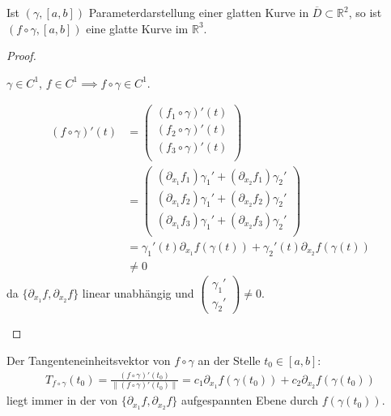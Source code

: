 \begin{theorem}[Satz]
  Ist $(\gamma,[a,b])$ Parameterdarstellung einer glatten Kurve in $\overline{D} \subset \mathbb{R}^2$, so ist $(f \circ \gamma,[a,b])$ eine glatte Kurve im $\mathbb{R}^3$.
  
  \begin{proof}
    \begin{enum-arab}
      \item $\gamma \in C^1$, $f \in C^1 \implies f \circ \gamma \in C^1$.
      
      \item 
      \begin{align*}
        (f \circ \gamma)'(t) &=
        \begin{pmatrix}
          (f_1 \circ \gamma)'(t) \\
          (f_2 \circ \gamma)'(t) \\
          (f_3 \circ \gamma)'(t) \\
        \end{pmatrix} \\
        &=
        \begin{pmatrix}
          (\partial_{x_1} f_1) \gamma_1' + (\partial_{x_2} f_1) \gamma_2' \\
          (\partial_{x_1} f_2) \gamma_1' + (\partial_{x_2} f_2) \gamma_2' \\
          (\partial_{x_1} f_3) \gamma_1' + (\partial_{x_2} f_3) \gamma_2' \\
        \end{pmatrix} \\
        &= \gamma_1'(t) \partial_{x_1} f(\gamma(t)) + \gamma_2'(t) \partial_{x_2} f(\gamma(t)) \\
        &\neq 0
      \end{align*}
      da $\{ \partial_{x_1} f, \partial_{x_2} f \}$ linear unabhängig und $\left(\begin{smallmatrix} \gamma_1' \\ \gamma_2' \end{smallmatrix}\right) \neq 0$.
    \end{enum-arab}
  \end{proof}
\end{theorem}

\begin{notice}[Folgerung:]
  Der Tangenteneinheitsvektor von $f \circ \gamma$ an der Stelle $t_0 \in [a,b]$:
  \begin{align*}
    T_{f \circ \gamma}(t_0) = \frac{(f \circ \gamma)'(t_0)}{\| (f \circ \gamma)'(t_0) \|} = c_1 \partial_{x_1} f(\gamma(t_0)) + c_2 \partial_{x_2} f(\gamma(t_0))
  \end{align*}
  liegt immer in der von $\{ \partial_{x_1} f, \partial_{x_2} f \}$ aufgespannten Ebene durch $f(\gamma(t_0))$.
\end{notice}

